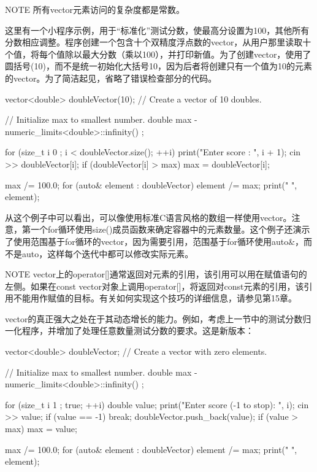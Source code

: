 \begin{myNotic}{NOTE}
所有vector元素访问的复杂度都是常数。
\end{myNotic}

这里有一个小程序示例，用于“标准化”测试分数，使最高分设置为100，其他所有分数相应调整。程序创建一个包含十个双精度浮点数的vector，从用户那里读取十个值，将每个值除以最大分数（乘以100），并打印新值。为了创建vector，使用了圆括号(10)，而不是统一初始化大括号{10}，因为后者将创建只有一个值为10的元素的vector。为了简洁起见，省略了错误检查部分的代码。

\begin{cpp}
vector<double> doubleVector(10); // Create a vector of 10 doubles.

// Initialize max to smallest number.
double max { -numeric_limits<double>::infinity() };

for (size_t i { 0 }; i < doubleVector.size(); ++i) {
    print("Enter score {}: ", i + 1);
    cin >> doubleVector[i];
    if (doubleVector[i] > max) {
        max = doubleVector[i];
    }
}

max /= 100.0;
for (auto& element : doubleVector) {
    element /= max;
    print("{} ", element);
}
\end{cpp}

从这个例子中可以看出，可以像使用标准C语言风格的数组一样使用vector。注意，第一个for循环使用size()成员函数来确定容器中的元素数量。这个例子还演示了使用范围基于for循环的vector，因为需要引用，范围基于for循环使用auto\&，而不是auto，这样每个迭代中都可以修改实际元素。

\begin{myNotic}{NOTE}
vector上的operator[]通常返回对元素的引用，该引用可以用在赋值语句的左侧。如果在const vector对象上调用operator[]，将返回对const元素的引用，该引用不能用作赋值的目标。有关如何实现这个技巧的详细信息，请参见第15章。
\end{myNotic}


vector的真正强大之处在于其动态增长的能力。例如，考虑上一节中的测试分数归一化程序，并增加了处理任意数量测试分数的要求。这是新版本：

\begin{cpp}
vector<double> doubleVector; // Create a vector with zero elements.

// Initialize max to smallest number.
double max { -numeric_limits<double>::infinity() };

for (size_t i { 1 }; true; ++i) {
    double value;
    print("Enter score {} (-1 to stop): ", i);
    cin >> value;
    if (value == -1) {
        break;
    }
    doubleVector.push_back(value);
    if (value > max) {
        max = value;
    }
}

max /= 100.0;
for (auto& element : doubleVector) {
    element /= max;
    print("{} ", element);
}
\end{cpp}

